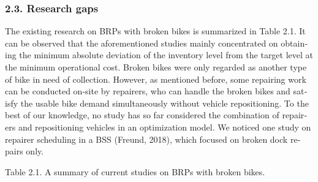 \documentclass[
  english,
]{article}
\begin{document}
\begin{otherlanguage}{english}
\protect{}\label{s0025}
\subsubsection{2.3. Research gaps}\label{st045}

\protect{}\label{p0130}
The existing research on BRPs with broken bikes is summarized in Table 2.1. It can be observed that
the aforementioned studies mainly concentrated on obtaining the minimum absolute deviation of the
inventory level from the target level at the minimum operational cost. Broken bikes were only
regarded as another type of bike in need of collection. However, as mentioned before, some repairing
work can be conducted on-site by repairers, who can handle the broken bikes and satisfy the usable
bike demand simultaneously without vehicle repositioning. To the best of our knowledge, no study has
so far considered the combination of repairers and repositioning vehicles in an optimization model.
We noticed one study on repairer scheduling in a BSS (Freund, 2018), which focused on broken dock
repairs only.

\clearpage
\begin{landscape}
\scriptsize
\setlength{\tabcolsep}{2pt}
\renewcommand{\arraystretch}{0.78}
\setlength{\LTpre}{0pt}
\setlength{\LTpost}{0pt}
\protect{}\label{t0005}
Table 2.1. A summary of current studies on BRPs with broken bikes.


\end{landscape}
\end{otherlanguage}
\end{document}
